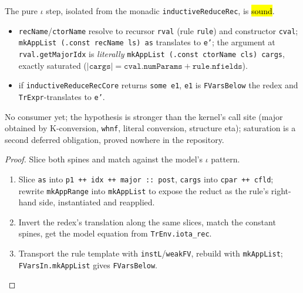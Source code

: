 \begin{theorem}
  \label{thm:vtc-iota-reduce-core}
  \leanok

   The pure $\iota$ step, isolated from the monadic
  \texttt{inductiveReduceRec}, is \hl{sound}.
  \begin{itemize}
  \item {} \texttt{recName}/\texttt{ctorName} resolve to recursor \texttt{rval} (rule
    \texttt{rule}) and constructor \texttt{cval}; \texttt{mkAppList (.const recName ls) as}
    translates to \texttt{e'}; the argument at \texttt{rval.getMajorIdx} is \emph{literally}
    \texttt{mkAppList (.const ctorName cls) cargs}, exactly saturated
    ($|\mathtt{cargs}| = \mathtt{cval.numParams} + \mathtt{rule.nfields}$).
  \item {} if \texttt{inductiveReduceRecCore} returns \texttt{some e1}, \texttt{e1} is
    \texttt{FVarsBelow} the redex and \texttt{TrExpr}-translates to \texttt{e'}.
  \end{itemize}
   No consumer yet; the hypothesis is stronger than the kernel's call site (major
  obtained by K-conversion, \texttt{whnf}, literal conversion, structure eta); saturation is a
  second deferred obligation, proved nowhere in the repository.
\end{theorem}
\begin{proof}
  \leanok
   Slice both spines and match against the model's $\iota$ pattern.
  \begin{enumerate}
  \item Slice \texttt{as} into \texttt{p1 ++ idx ++ major :: post}, \texttt{cargs} into
    \texttt{cpar ++ cfld}; rewrite \texttt{mkAppRange} into \texttt{mkAppList} to expose the
    reduct as the rule's right-hand side, instantiated and reapplied.
  \item Invert the redex's translation along the same slices, match the constant spines, get the
    model equation from \texttt{TrEnv.iota\_rec}.
  \item Transport the rule template with \texttt{instL}/\texttt{weakFV}, rebuild with
    \texttt{mkAppList}; \texttt{FVarsIn.mkAppList} gives \texttt{FVarsBelow}.
  \end{enumerate}
\end{proof}


